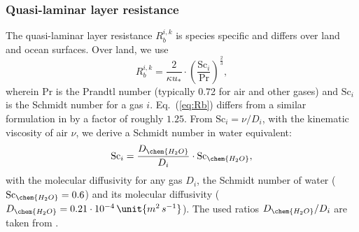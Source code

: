 \documentclass[gmd, manuscript]{copernicus}
\begin{document}
\subsubsection{Quasi-laminar layer resistance}
\label{subsubsec:Rb}
The quasi-laminar layer resistance $R_b^{i,k}$ is species specific and differs over land and ocean surfaces.
Over land, we use \citep[Eq.~(53),][]{ACP:Simpson2012}
\begin{equation}
  R_b^{i,k} = \frac{2}{\kappa u_*} \cdot \left(\frac{\text{Sc}_i}{\text{Pr}}\right)^{\frac{2}{3}},
  \label{eq:Rb}
\end{equation}
wherein $\text{Pr}$ is the Prandtl number (typically 0.72 for air and other gases) and $\text{Sc}_i$ is the Schmidt number for a gas $i$. Eq.~(\ref{eq:Rb}) differs from a similar formulation in \citet{ACP:Seinfeld2006} by a factor of roughly $1.25$. From $\text{Sc}_i = \nu/D_i$, with the kinematic viscosity of air $\nu$, we derive a Schmidt number in water equivalent:
\begin{equation}
  \text{Sc}_i = \frac{D_\chem{H_2O}}{D_i} \cdot \text{Sc}_\chem{H_2O},
\end{equation}
with the molecular diffusivity for any gas $D_i$, the Schmidt number of water ($\text{Sc}_\chem{H_2O}=0.6$) and its molecular diffusivity ($D_\chem{H_2O}=0.21\cdot10^{-4}\,\unit{m^2\,s^{-1}}$). The used ratios $D_\chem{H_2O}/D_i$ are taken from \citet[][Table S18]{ACP:Simpson2012}.\\
\end{document}
